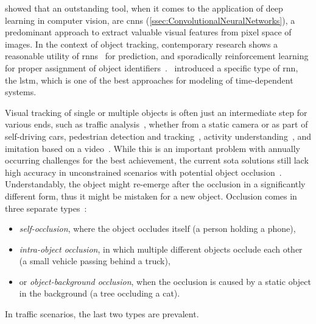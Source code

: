 \cite{Krizhevsky2012} showed that an outstanding tool, when it comes to the application of deep learning in computer vision, are \glspl{cnn} (\cref{ssec:ConvolutionalNeuralNetworks}), a predominant approach to extract valuable visual features from pixel space of images. In the context of object tracking, contemporary research shows a reasonable utility of \glspl{rnn}~\cite{rumelhart:errorpropnonote} for prediction, and sporadically reinforcement learning for proper assignment of object identifiers~\cite{Zhang2017}.~\cite{Hochreiter1997} introduced a specific type of \gls{rnn}, the \gls{lstm}, which is one of the best approaches for modeling of time-dependent systems.

Visual tracking of single or multiple objects is often just an intermediate step for various ends, such as traffic analysis~\cite{Tang2019}, whether from a static camera or as part of self-driving cars, pedestrian detection and tracking~\cite{Leal-Taixe2017}, activity understanding~\cite{DBLP:journals/corr/abs-1709-04905}, and imitation based on a video~\cite{2018-TOG-SFV}. While this is an important problem with annually occurring challenges for the best achievement, the current \gls{sota} solutions still lack high accuracy in unconstrained scenarios with potential object occlusion~\cite{Jiyan2007}. Understandably, the object might re-emerge after the occlusion in a significantly different form, thus it might be mistaken for a new object. Occlusion comes in three separate types~\cite{gabriel2003state}:

\begin{itemize}
    \item \emph{self-occlusion}, where the object occludes itself (a person holding a phone),
    \item \emph{intra-object occlusion}, in which multiple different objects occlude each other (a small vehicle passing behind a truck),
    \item or \emph{object-background occlusion}, when the occlusion is caused by a static object in the background (a tree occluding a cat).
\end{itemize}

\noindent In traffic scenarios, the last two types are prevalent.

